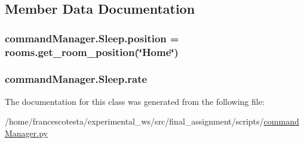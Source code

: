 \subsection{Member Data Documentation}
\subsubsection[{\texorpdfstring{position}{position}}]{\setlength{\rightskip}{0pt plus 5cm}command\+Manager.\+Sleep.\+position = rooms.\+get\+\_\+room\+\_\+position(\char`\"{}Home\char`\"{})\hspace{0.3cm}{\ttfamily [static]}}\hypertarget{classcommandManager_1_1Sleep_ab64714b4c7c4b5a8824986a8e7af976e}{}\label{classcommandManager_1_1Sleep_ab64714b4c7c4b5a8824986a8e7af976e}
\subsubsection[{\texorpdfstring{rate}{rate}}]{\setlength{\rightskip}{0pt plus 5cm}command\+Manager.\+Sleep.\+rate}\hypertarget{classcommandManager_1_1Sleep_ad1bca2bd2c57109d92089b82fafe23c1}{}\label{classcommandManager_1_1Sleep_ad1bca2bd2c57109d92089b82fafe23c1}


The documentation for this class was generated from the following file\+:\begin{DoxyCompactItemize}
\item 
/home/francescotesta/experimental\+\_\+ws/src/final\+\_\+assignment/scripts/\hyperlink{commandManager_8py}{command\+Manager.\+py}\end{DoxyCompactItemize}
